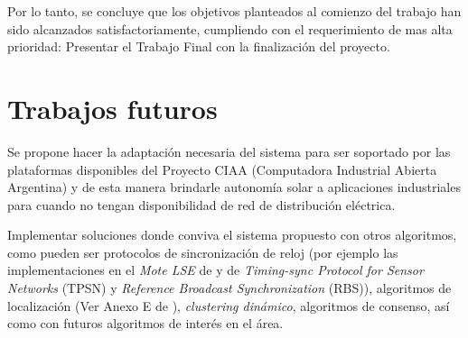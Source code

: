 \medskip

Por lo tanto, se concluye que los objetivos planteados al comienzo del trabajo han sido alcanzados satisfactoriamente, cumpliendo con el requerimiento de mas alta prioridad: Presentar el Trabajo Final con la finalización del proyecto.

\section{Trabajos futuros}

Se propone hacer la adaptación necesaria del sistema para ser soportado por las plataformas disponibles del Proyecto CIAA \citep{CIAA} (Computadora Industrial Abierta Argentina) y de esta manera brindarle autonomía solar a aplicaciones industriales para cuando no tengan disponibilidad de red de distribución eléctrica.

Implementar soluciones donde conviva el sistema propuesto con otros algoritmos, como pueden ser protocolos de sincronización de reloj (por ejemplo las implementaciones en el \textit{Mote LSE} de \citep{sync1} y \citep{sync2} de \textit{Timing-sync Protocol for Sensor Networks} (TPSN) y \textit{Reference Broadcast Synchronization} (RBS)), algoritmos de localización (Ver Anexo E de \citep{802154}), \textit{clustering dinámico}, algoritmos de consenso, así como con futuros algoritmos de interés en el área.

